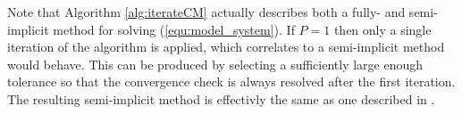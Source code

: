 Note that Algorithm \ref{alg:iterateCM} actually describes both a fully- and semi- implicit method for solving (\ref{equ:model_system}). 
If $P = 1$ then only a single iteration of the algorithm is applied, which correlates to a semi-implicit method would behave.
This can be produced by selecting a sufficiently large enough tolerance so that the convergence check is always resolved after the first iteration.
The resulting semi-implicit method is effectivly the same as one described in \cite{sirca2012computational}.



